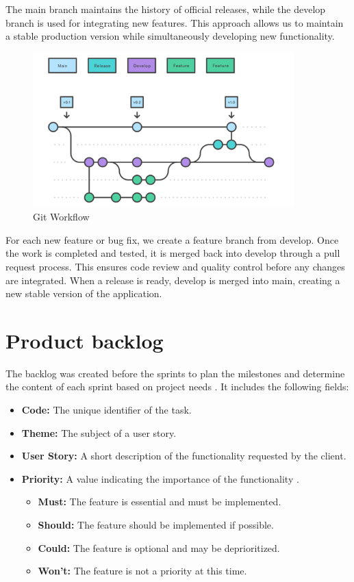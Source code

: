 The main branch maintains the history of official releases, while the develop branch is used for integrating new features. This approach allows us to maintain a stable production version while simultaneously developing new functionality.
\begin{figure}[ht!]
    \centering
    \includegraphics[width=0.9\textwidth]{images/gitWorkflow.png}
    \caption{Git Workflow}
    \label{fig:git-workflow}
\end{figure}

For each new feature or bug fix, we create a feature branch from develop. Once the work is completed and tested, it is merged back into develop through a pull request process. This ensures code review and quality control before any changes are integrated. When a release is ready, develop is merged into main, creating a new stable version of the application.

\section{Product backlog}

The backlog was created before the sprints to plan the milestones and determine the content of each sprint based on project needs \cite{SchwarzScrum2019}. It includes the following fields:
\begin{itemize}
    \item \textbf{Code:} The unique identifier of the task.
    \item \textbf{Theme:} The subject of a user story.
    \item \textbf{User Story:} A short description of the functionality requested by the client.
    \item \textbf{Priority:} A value indicating the importance of the functionality \cite{MoscowMethodology2021, CleggCaseMethod2004}.
    \begin{itemize}
        \item \textbf{Must:} The feature is essential and must be implemented.
        \item \textbf{Should:} The feature should be implemented if possible.
        \item \textbf{Could:} The feature is optional and may be deprioritized.
        \item \textbf{Won't:} The feature is not a priority at this time.
    \end{itemize}
\end{itemize}

